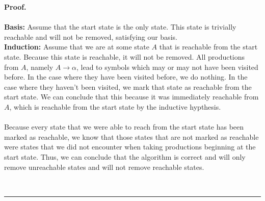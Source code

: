 \documentclass{article}%
\newenvironment{proof}[1][Proof]{\noindent\textbf{#1.} }{\ \rule{0.5em}{0.5em}}
\begin{document}
\begin{proof}\\
    \\
    \textbf{Basis:} Assume that the start state is the only state. This state is trivially reachable and will not be removed, satisfying our basis.
    \\[0.1in]
    \textbf{Induction:} Assume that we are at some state $A$ that is reachable from the start state. Because this state is reachable, it will not be removed. All productions from $A$, namely $A \rightarrow \alpha$, lead to symbols which may or may not have been visited before. In the case where they have been visited before, we do nothing. In the case where they haven't been visited, we mark that state as reachable from the start state. We can conclude that this because it was immediately reachable from $A$, which is reachable from the start state by the inductive hypthesis.\\
    \\[0.07in]
    Because every state that we were able to reach from the start state has been marked as reachable, we know that those states that are not marked as reachable were states that we did not encounter when taking productions beginning at the start state. Thus, we can conclude that the algorithm is correct and will only remove unreachable states and will not remove reachable states.

\end{proof}
\end{document}
